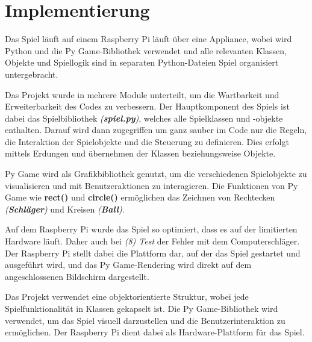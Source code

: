 \documentclass[a4paper,12pt]{article}
\begin{document}
\section{Implementierung}
Das Spiel läuft auf einem Raspberry Pi läuft über eine Appliance, wobei wird Python und die Py Game-Bibliothek verwendet und alle relevanten Klassen, Objekte und Spiellogik sind in separaten Python-Dateien Spiel organisiert untergebracht. \par \vspace\baselineskip
Das Projekt wurde in mehrere Module unterteilt, um die Wartbarkeit und Erweiterbarkeit des Codes zu verbessern. Der Hauptkomponent des Spiels ist dabei das Spielbibliothek \textit{(\textbf{spiel.py})}, welches alle Spielklassen und -objekte enthalten. Darauf wird dann zugegriffen um ganz sauber im Code nur die Regeln, die Interaktion der Spielobjekte und die Steuerung zu definieren. Dies erfolgt mittels Erdungen und übernehmen der Klassen beziehungsweise Objekte. \par \vspace\baselineskip
Py Game wird als Grafikbibliothek genutzt, um die verschiedenen Spielobjekte zu visualisieren und mit Benutzeraktionen zu interagieren. Die Funktionen von Py Game wie \textbf{rect()} und \textbf{circle()} ermöglichen das Zeichnen von Rechtecken \textit{(\textbf{Schläger})} und Kreisen \textit{(\textbf{Ball})}. \par \vspace\baselineskip
Auf dem Raspberry Pi wurde das Spiel so optimiert, dass es auf der limitierten Hardware läuft. Daher auch bei \textit{(8) Test} der Fehler mit dem Computerschläger. Der Raspberry Pi stellt dabei die Plattform dar, auf der das Spiel gestartet und ausgeführt wird, und das Py Game-Rendering wird direkt auf dem angeschlossenen Bildschirm dargestellt. \par \vspace\baselineskip
Das Projekt verwendet eine objektorientierte Struktur, wobei jede Spielfunktionalität in Klassen gekapselt ist. Die Py Game-Bibliothek wird verwendet, um das Spiel visuell darzustellen und die Benutzerinteraktion zu ermöglichen. Der Raspberry Pi dient dabei als Hardware-Plattform für das Spiel.
\clearpage
\end{document}
